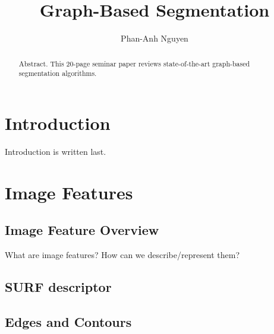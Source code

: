 \documentclass{SMBV12}
\begin{document}
\title{Graph-Based Segmentation}

\author{Phan-Anh Nguyen}

\maketitle


\begin{abstract}%
Abstract. This 20-page seminar paper reviews state-of-the-art graph-based segmentation algorithms.
\end{abstract}



%
\section{Introduction}

Introduction is written last.



%
\section{Image Features}


\subsection{Image Feature Overview}

What are image features? How can we describe/represent them?


\subsection{SURF descriptor}




\subsection{Edges and Contours}
\end{document}
